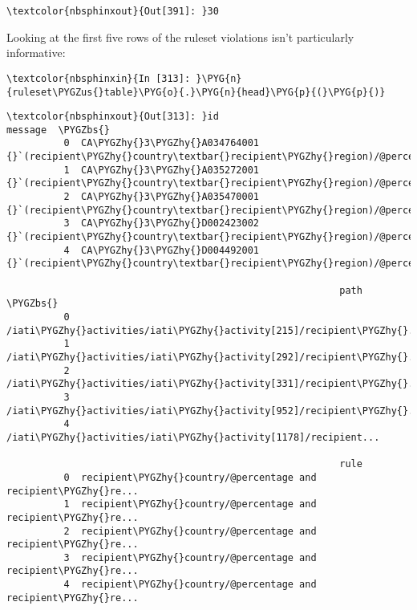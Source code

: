\documentclass[letterpaper,10pt,english]{sphinxmanual}
\begin{document}
\begin{Verbatim}[commandchars=\\\{\}]
\textcolor{nbsphinxout}{Out[391]: }30
\end{Verbatim}

Looking at the first five rows of the ruleset violations isn't
particularly informative:

\begin{Verbatim}[commandchars=\\\{\}]
\textcolor{nbsphinxin}{In [313]: }\PYG{n}{ruleset\PYGZus{}table}\PYG{o}{.}\PYG{n}{head}\PYG{p}{(}\PYG{p}{)}
\end{Verbatim}

\begin{Verbatim}[commandchars=\\\{\}]
\textcolor{nbsphinxout}{Out[313]: }id                                            message  \PYGZbs{}
          0  CA\PYGZhy{}3\PYGZhy{}A034764001  {}`(recipient\PYGZhy{}country\textbar{}recipient\PYGZhy{}region)/@percent...
          1  CA\PYGZhy{}3\PYGZhy{}A035272001  {}`(recipient\PYGZhy{}country\textbar{}recipient\PYGZhy{}region)/@percent...
          2  CA\PYGZhy{}3\PYGZhy{}A035470001  {}`(recipient\PYGZhy{}country\textbar{}recipient\PYGZhy{}region)/@percent...
          3  CA\PYGZhy{}3\PYGZhy{}D002423002  {}`(recipient\PYGZhy{}country\textbar{}recipient\PYGZhy{}region)/@percent...
          4  CA\PYGZhy{}3\PYGZhy{}D004492001  {}`(recipient\PYGZhy{}country\textbar{}recipient\PYGZhy{}region)/@percent...
          
                                                          path  \PYGZbs{}
          0  /iati\PYGZhy{}activities/iati\PYGZhy{}activity[215]/recipient\PYGZhy{}...
          1  /iati\PYGZhy{}activities/iati\PYGZhy{}activity[292]/recipient\PYGZhy{}...
          2  /iati\PYGZhy{}activities/iati\PYGZhy{}activity[331]/recipient\PYGZhy{}...
          3  /iati\PYGZhy{}activities/iati\PYGZhy{}activity[952]/recipient\PYGZhy{}...
          4  /iati\PYGZhy{}activities/iati\PYGZhy{}activity[1178]/recipient...
          
                                                          rule
          0  recipient\PYGZhy{}country/@percentage and recipient\PYGZhy{}re...
          1  recipient\PYGZhy{}country/@percentage and recipient\PYGZhy{}re...
          2  recipient\PYGZhy{}country/@percentage and recipient\PYGZhy{}re...
          3  recipient\PYGZhy{}country/@percentage and recipient\PYGZhy{}re...
          4  recipient\PYGZhy{}country/@percentage and recipient\PYGZhy{}re...
\end{Verbatim}
\end{document}
